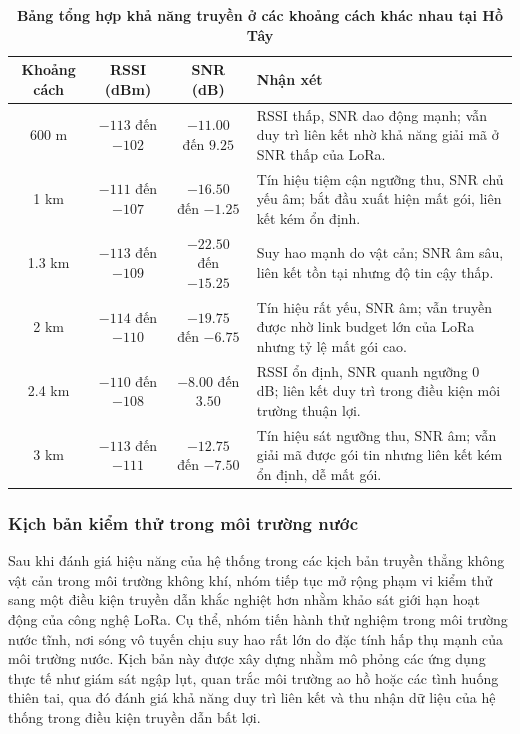 \documentclass{article}
\begin{document}
	\begin{table}[H]
		\caption[Bảng tổng hợp khả năng truyền ở các khoảng cách khác nhau tại Hồ Tây]{\bfseries \fontsize{12pt}{0pt}\selectfont Bảng tổng hợp khả năng truyền ở các khoảng cách khác nhau tại Hồ Tây}
		\label{tab33}
		\centering
		\begin{tabular}{|c|c|c|p{5cm}|}
			\hline
			\textbf{Khoảng cách} & \textbf{RSSI (dBm)} & \textbf{SNR (dB)} & \textbf{Nhận xét} \\ \hline
			600 m & $-113$ đến $-102$ & $-11.00$ đến $9.25$
			& RSSI thấp, SNR dao động mạnh; vẫn duy trì liên kết nhờ khả năng giải mã ở SNR thấp của LoRa. \\ \hline
			
			1 km & $-111$ đến $-107$ & $-16.50$ đến $-1.25$
			& Tín hiệu tiệm cận ngưỡng thu, SNR chủ yếu âm; bắt đầu xuất hiện mất gói, liên kết kém ổn định. \\ \hline
			
			1.3 km & $-113$ đến $-109$ & $-22.50$ đến $-15.25$
			& Suy hao mạnh do vật cản; SNR âm sâu, liên kết tồn tại nhưng độ tin cậy thấp. \\ \hline
			
			2 km & $-114$ đến $-110$ & $-19.75$ đến $-6.75$
			& Tín hiệu rất yếu, SNR âm; vẫn truyền được nhờ link budget lớn của LoRa nhưng tỷ lệ mất gói cao. \\ \hline
			
			2.4 km & $-110$ đến $-108$ & $-8.00$ đến $3.50$
			& RSSI ổn định, SNR quanh ngưỡng 0 dB; liên kết duy trì trong điều kiện môi trường thuận lợi. \\ \hline
			
			3 km & $-113$ đến $-111$ & $-12.75$ đến $-7.50$
			& Tín hiệu sát ngưỡng thu, SNR âm; vẫn giải mã được gói tin nhưng liên kết kém ổn định, dễ mất gói. \\ \hline
		\end{tabular}
	\end{table}
	
	\subsubsection{Kịch bản kiểm thử trong môi trường nước}
	
	Sau khi đánh giá hiệu năng của hệ thống trong các kịch bản truyền thẳng không vật cản trong môi trường không khí, nhóm tiếp tục mở rộng phạm vi kiểm thử sang một điều kiện truyền dẫn khắc nghiệt hơn nhằm khảo sát giới hạn hoạt động của công nghệ LoRa. Cụ thể, nhóm tiến hành thử nghiệm trong môi trường nước tĩnh, nơi sóng vô tuyến chịu suy hao rất lớn do đặc tính hấp thụ mạnh của môi trường nước. Kịch bản này được xây dựng nhằm mô phỏng các ứng dụng thực tế như giám sát ngập lụt, quan trắc môi trường ao hồ hoặc các tình huống thiên tai, qua đó đánh giá khả năng duy trì liên kết và thu nhận dữ liệu của hệ thống trong điều kiện truyền dẫn bất lợi.
	
\end{document}
